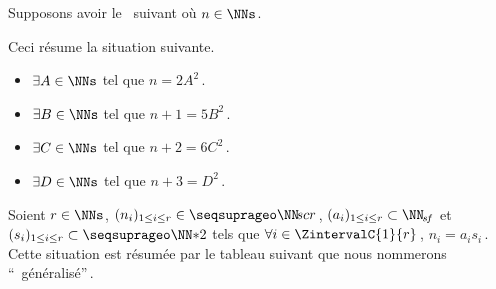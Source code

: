 \begin{example}
	Supposons avoir le \sftab\ suivant où $n \in \NNs$.

	\begin{center}
	\end{center}

	Ceci résume la situation suivante.

	\vspace{-1ex}
	\begin{multicols}{2}
	\begin{itemize}
		\item $\exists A \in \NNs$ tel que $n     = 2 A^2$\,.

		\item $\exists B \in \NNs$ tel que $n + 1 = 5 B^2$\,.

		\item $\exists C \in \NNs$ tel que $n + 2 = 6 C^2$\,.

		\item $\exists D \in \NNs$ tel que $n + 3 =   D^2$\,.
	\end{itemize}
	\end{multicols}
\end{example}




\begin{defi}
	Soient $r \in \NNs$,
	$( n_i )_{1 \leq i \leq r} \in \NNseq[r]$\,,
	$( a_i )_{1 \leq i \leq r} \subset \NNsf$
	et
	$( s_i )_{1 \leq i \leq r} \subset \NNssquare$
	tels que
	$\forall i \in \ZintervalC{1}{r}$\,, $n_i = a_i s_i$\,.
	Cette situation est résumée par le tableau suivant que nous nommerons \enquote{\sftab\ généralisé}\,.

	\begin{center}
	\end{center}
\end{defi}


